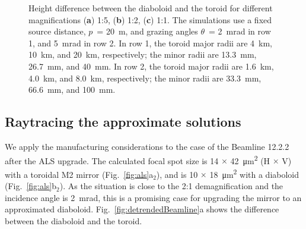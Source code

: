 \documentclass{iucr}       %
\begin{document}
\begin{figure}
\caption{Height difference between the diaboloid and the toroid for different magnifications (\textbf{a}) 1:5, (\textbf{b}) 1:2, (\textbf{c}) 1:1. The simulations use a fixed source distance, $p$~= \SI{20}{\meter}, and grazing angles $\theta$~= \SI{2}{\milli\radian} in row 1, and \SI{5}{\milli\radian} in row 2. In row 1, the toroid major radii are 4~km, 10~km, and 20~km, respectively; the minor radii are 13.3~mm, 26.7~mm, and 40~mm. In row 2, the toroid major radii are 1.6~km, 4.0~km, and 8.0~km, respectively; the minor radii are 33.3~mm, 66.6~mm, and 100~mm.}
\end{figure}

\subsection{Raytracing the approximate solutions}
We apply the manufacturing considerations to the case of the Beamline 12.2.2 after the ALS upgrade. The calculated focal spot size is 14 $\times$ \SI{42}{\micro\meter^2} (H $\times$ V) with a toroidal M2 mirror (Fig.~\ref{fig:als}a$_2$), and is 10 $\times$ \SI{18}{\micro\meter^2} with a diaboloid (Fig.~\ref{fig:als}b$_2$). As the situation is close to the 2:1 demagnification and the incidence angle is \SI{2}{\milli\radian}, this is a promising case for upgrading the mirror to an approximated diaboloid. Fig.~\ref{fig:detrendedBeamline}a shows the difference between the diaboloid and the toroid. 
\end{document}
